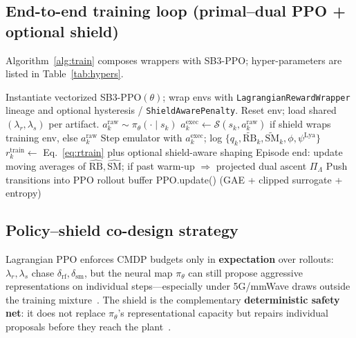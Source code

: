 \documentclass[preprint,12pt,times]{elsarticle}
\begin{document}
\subsection{End-to-end training loop (primal--dual PPO + optional shield)}

Algorithm~\ref{alg:train} composes wrappers with SB3-PPO; hyper-parameters are listed in Table~\ref{tab:hypers}.

\begin{algorithm}[!htbp]
\footnotesize
\caption{Lagrangian PPO training with optional shield-at-train}
\label{alg:train}
\begin{algorithmic}[1]
\STATE Instantiate vectorized SB3-PPO\((\theta)\); wrap envs with \texttt{LagrangianRewardWrapper} lineage and optional hysteresis / \texttt{ShieldAwarePenalty}.
        \STATE Reset env; load shared \((\lambda_r,\lambda_s)\) per artifact.
            \STATE \(a^{\mathrm{raw}}_k\sim\pi_\theta(\cdot\mid s_k)\)
            \STATE \(a^{\mathrm{exec}}_k \gets \mathcal{S}(s_k,a^{\mathrm{raw}}_k)\) if shield wraps training env, else \(a^{\mathrm{raw}}_k\)
            \STATE Step emulator with \(a^{\mathrm{exec}}_k\); log \(\{q_k,\widetilde{\mathrm{RB}}_k,\widetilde{\mathrm{SM}}_k,\phi,\psi^{\mathrm{Lya}}\}\)
            \STATE \(r^{\mathrm{train}}_k \gets\) Eq.~\eqref{eq:rtrain} plus optional shield-aware shaping
        \ENDFOR
        \STATE Episode end: update moving averages of \(\hat{\mathrm{RB}},\hat{\mathrm{SM}}\); if past warm-up \(\Rightarrow\) projected dual ascent \(\Pi_{\Lambda}\)
        \STATE Push transitions into PPO rollout buffer
    \ENDFOR
    \STATE PPO.update() (GAE + clipped surrogate + entropy)
\ENDFOR
\end{algorithmic}
\end{algorithm}

\subsection{Policy--shield co-design strategy}\label{sec:method:codesign}

Lagrangian PPO enforces CMDP budgets only in \textbf{expectation} over rollouts: \(\lambda_r,\lambda_s\) chase \(\delta_{\mathrm{rf}},\delta_{\mathrm{sm}}\), but the neural map \(\pi_\theta\) can still propose aggressive representations on individual steps---especially under 5G/mmWave draws outside the training mixture~\cite{meng2024mmwave,paternain2019dual}.
The shield is the complementary \textbf{deterministic safety net}: it does not replace \(\pi_\theta\)'s representational capacity but repairs individual proposals before they reach the plant~\cite{alshiekh2018shielding}.
\end{document}
